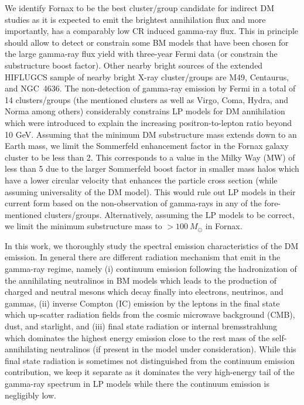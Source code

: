\documentclass[10pt,aps,pra,reprint,amsmath,amsfonts,amssymb,showpacs,nofootinbib,floatfix]{revtex4-1}
\newcommand{\msun}{M_\odot}
\begin{document}
We identify Fornax to be the best cluster/group candidate for indirect
DM studies as it is expected to emit the brightest annihilation flux
and more importantly, has a comparably low CR induced gamma-ray flux.
This in principle should allow to detect or constrain some BM models
that have been chosen for the large gamma-ray flux yield with
three-year Fermi data (or constrain the substructure boost
factor). Other nearby bright sources of the extended HIFLUGCS sample
of nearby bright X-ray cluster/groups are M49, Centaurus, and
NGC~4636.  The non-detection of gamma-ray emission by Fermi in a total
of 14 clusters/groups (the mentioned clusters as well as Virgo, Coma,
Hydra, and Norma among others) considerably constrains LP models for
DM annihilation which were introduced to explain the increasing
positron-to-lepton ratio beyond 10 GeV. Assuming that the minimum DM
substructure mass extends down to an Earth mass, we limit the
Sommerfeld enhancement factor in the Fornax galaxy cluster to be less
than 2. This corresponds to a value in the Milky Way (MW) of less than
5 due to the larger Sommerfeld boost factor in smaller mass halos
which have a lower circular velocity that enhances the particle cross
section (while assuming universality of the DM model). This would rule
out LP models in their current form based on the non-observation of
gamma-rays in any of the fore-mentioned
clusters/groups. Alternatively, assuming the LP models to be correct,
we limit the minimum substructure mass to $>100~\msun$ in Fornax.

In this work, we thoroughly study the spectral emission
characteristics of the DM emission. In general there are different
radiation mechanism that emit in the gamma-ray regime, namely (i)
continuum emission following the hadronization of the annihilating
neutralinos in BM models which leads to the production of charged and
neutral mesons which decay finally into electrons, neutrinos, and
gammas, (ii) inverse Compton (IC) emission by the leptons in the final
state which up-scatter radiation fields from the cosmic microwave
background (CMB), dust, and starlight, and (iii) final state radiation
or internal bremsstrahlung which dominates the highest energy emission
close to the rest mass of the self-annihilating neutralinos (if
present in the model under consideration). While this final state
radiation is sometimes not distinguished from the continuum emission
contribution, we keep it separate as it dominates the very high-energy
tail of the gamma-ray spectrum in LP models while there the continuum
emission is negligibly low.
\end{document}
